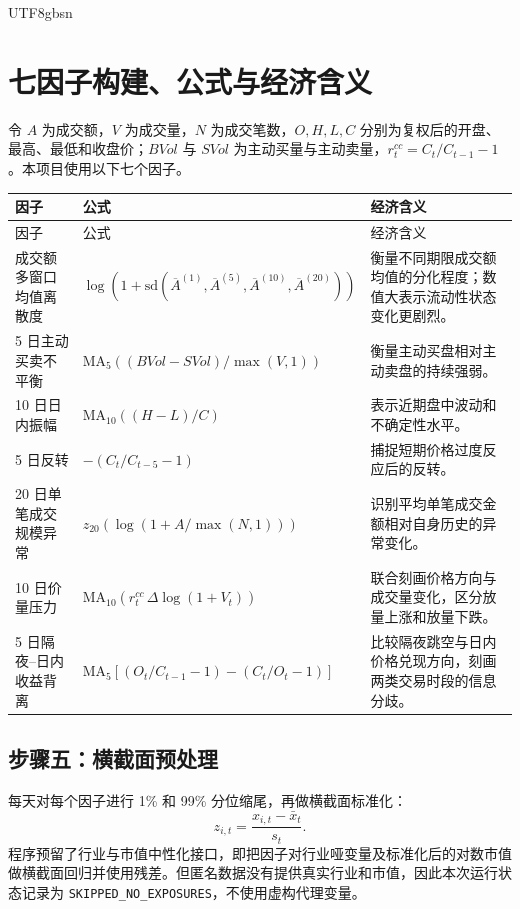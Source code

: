 \documentclass[a4paper,11pt,openany]{report}
\newcommand{\code}[1]{\texttt{#1}}
\begin{document}
\begin{CJK*}{UTF8}{gbsn}
\chapter{七因子构建、公式与经济含义}

令 $A$ 为成交额，$V$ 为成交量，$N$ 为成交笔数，$O,H,L,C$ 分别为复权后的开盘、最高、最低和收盘价；$BVol$ 与 $SVol$ 为主动买量与主动卖量，$r^{cc}_t=C_t/C_{t-1}-1$。本项目使用以下七个因子。

\begin{longtable}{p{}p{}p{}}
\toprule
因子 & 公式 & 经济含义 \\
\midrule
\endfirsthead
\toprule
因子 & 公式 & 经济含义 \\
\midrule
\endhead
成交额多窗口均值离散度 & $\log\!\left(1+\mathrm{sd}(\overline A^{(1)},\overline A^{(5)},\overline A^{(10)},\overline A^{(20)})\right)$ & 衡量不同期限成交额均值的分化程度；数值大表示流动性状态变化更剧烈。\\
5 日主动买卖不平衡 & $\mathrm{MA}_5\!\left((BVol-SVol)/\max(V,1)\right)$ & 衡量主动买盘相对主动卖盘的持续强弱。\\
10 日日内振幅 & $\mathrm{MA}_{10}\!\left((H-L)/C\right)$ & 表示近期盘中波动和不确定性水平。\\
5 日反转 & $-\left(C_t/C_{t-5}-1\right)$ & 捕捉短期价格过度反应后的反转。\\
20 日单笔成交规模异常 & $z_{20}\!\left(\log(1+A/\max(N,1))\right)$ & 识别平均单笔成交金额相对自身历史的异常变化。\\
10 日价量压力 & $\mathrm{MA}_{10}\!\left(r^{cc}_t\,\Delta\log(1+V_t)\right)$ & 联合刻画价格方向与成交量变化，区分放量上涨和放量下跌。\\
5 日隔夜--日内收益背离 & $\mathrm{MA}_5\!\left[(O_t/C_{t-1}-1)-(C_t/O_t-1)\right]$ & 比较隔夜跳空与日内价格兑现方向，刻画两类交易时段的信息分歧。\\
\bottomrule
\end{longtable}

\section{步骤五：横截面预处理}

每天对每个因子进行 1\% 和 99\% 分位缩尾，再做横截面标准化：
\begin{equation}
z_{i,t}=\frac{x_{i,t}-\bar x_t}{s_t}.
\end{equation}
程序预留了行业与市值中性化接口，即把因子对行业哑变量及标准化后的对数市值做横截面回归并使用残差。但匿名数据没有提供真实行业和市值，因此本次运行状态记录为 \code{SKIPPED\_NO\_EXPOSURES}，不使用虚构代理变量。


\end{CJK*}
\end{document}
